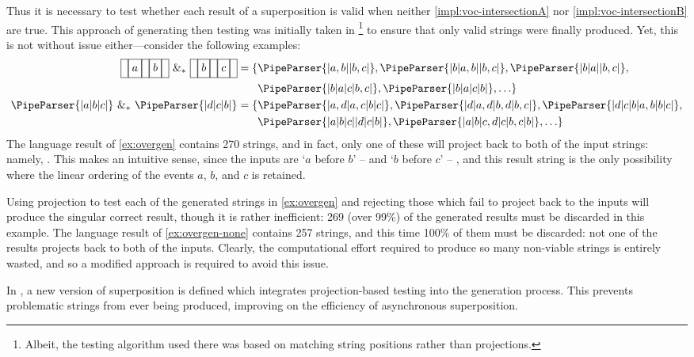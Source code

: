 \documentclass[a4paper,12pt,leqno,twoside]{article}
\newcommand{\vph}[1]{\vphantom{#1}}
\newcommand{\ebox}[1]{\fbox{$\vph{'(),}#1$}}
\newcommand{\nbBefore}[2]{\ebox{#1}\ebox{}\ebox{#2}}
\newcommand{\Before}[2]{\ebox{}\nbBefore{#1}{#2}\ebox{}}
\newcommand{\cBefore}[2]{`$#1$  before $#2$' -- \Before{#1}{#2}}
\newcommand{\spasync}{~\&_*~}
\newcommand{\EventString}[1]{%
	\renewcommand*{\do}[1]{\ebox{##1}}%
	\PipeParser{#1}%
}
\begin{document}
Thus it is necessary to test whether each result of a superposition is valid when neither \cref{impl:voc-intersectionA} nor \cref{impl:voc-intersectionB} are true. This approach of generating then testing was initially taken in \citet{woods2017towards}\footnote{Albeit, the testing algorithm used there was based on matching string positions rather than projections.} to ensure that only valid strings were finally produced. Yet, this is not without issue either---consider the following examples:
\begin{align}
	\Before{a}{b} \spasync \Before{b}{c} = \{&\EventString{{}|a,b|{}|b,c|{}}, \EventString{{}|b|a,b|{}|b,c|{}}, \EventString{{}|b|a|{}|b,c|{}},\label{ex:overgen}\\
	&\EventString{{}|b|a|c|b,c|{}}, \EventString{{}|b|a|c|b|{}}, \ldots\}\notag\\
	\EventString{{}|a|b|c|{}} \spasync \EventString{{}|d|c|b|{}} = \{&\EventString{{}|a,d|a,c|b|c|{}}, \EventString{{}|d|a,d|b,d|b,c|{}}, \EventString{{}|d|c|b|a,b|b|c|{}},\label{ex:overgen-none}\\
	&\EventString{{}|a|b|c|{}|d|c|b|{}}, \EventString{{}|a|b|c,d|c|b,c|b|{}}, \ldots\}\notag
\end{align}
The language result of \cref{ex:overgen} contains 270 strings, and in fact, only one of these will project back to both of the input strings: namely, \EventString{{}|a|{}|b|{}|c|{}}. This makes an intuitive sense, since the inputs are \cBefore{a}{b} and \cBefore{b}{c}, and this result string is the only possibility where the linear ordering of the events $a$, $b$, and $c$ is retained.

Using projection to test each of the generated strings in \cref{ex:overgen} and rejecting those which fail to project back to the inputs will produce the singular correct result, though it is rather inefficient: 269 (over 99\%) of the generated results must be discarded in this example. The language result of \cref{ex:overgen-none} contains 257 strings, and this time 100\% of them must be discarded: not one of the results projects back to both of the inputs. Clearly, the computational effort required to produce so many non-viable strings is entirely wasted, and so a modified approach is required to avoid this issue.

In \citet{woods2018improving}, a new version of superposition is defined which integrates projection-based testing into the generation process. This prevents problematic strings from ever being produced, improving on the efficiency of asynchronous superposition.
\end{document}
